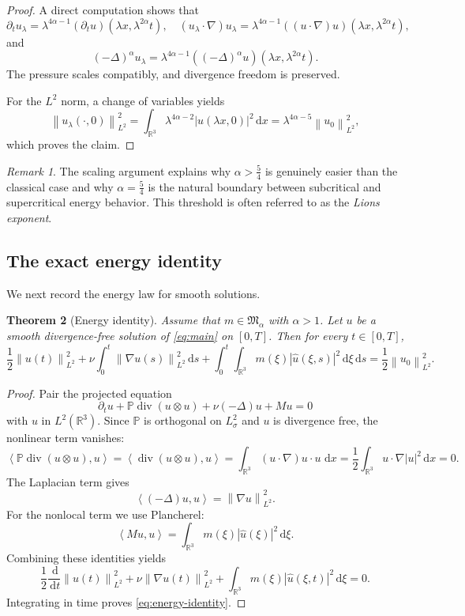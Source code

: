 \documentclass[11pt]{article}
\newtheorem{theorem}{Theorem}[section]
\theoremstyle{definition}
\theoremstyle{remark}
\newtheorem{remark}[theorem]{Remark}
\newcommand{\R}{\mathbb{R}}
\newcommand{\Pcal}{\mathbb{P}}
\newcommand{\dd}{\,\mathrm{d}}
\newcommand{\ip}[2]{\left\langle #1,#2\right\rangle}
\newcommand{\norm}[1]{\left\lVert #1\right\rVert}
\newcommand{\abs}[1]{\left\lvert #1\right\rvert}
\newcommand{\diver}{\operatorname{div}}
\begin{document}
\begin{proof}
A direct computation shows that
\[
\partial_t u_\lambda
=
\lambda^{4\alpha-1}(\partial_t u)(\lambda x,\lambda^{2\alpha}t),
\quad
(u_\lambda\cdot\nabla)u_\lambda
=
\lambda^{4\alpha-1}((u\cdot\nabla)u)(\lambda x,\lambda^{2\alpha}t),
\]
and
\[
(-\Delta)^\alpha u_\lambda
=
\lambda^{4\alpha-1}((-\Delta)^\alpha u)(\lambda x,\lambda^{2\alpha}t).
\]
The pressure scales compatibly, and divergence freedom is preserved.

For the $L^2$ norm, a change of variables yields
\[
\norm{u_\lambda(\cdot,0)}_{L^2}^2
=
\int_{\R^3}\lambda^{4\alpha-2}\abs{u(\lambda x,0)}^2\dd x
=
\lambda^{4\alpha-5}\norm{u_0}_{L^2}^2,
\]
which proves the claim.
\end{proof}

\begin{remark}
The scaling argument explains why $\alpha>\frac54$ is genuinely easier than the classical case and why $\alpha=\frac54$ is the natural boundary between subcritical and supercritical energy behavior. This threshold is often referred to as the \emph{Lions exponent}.
\end{remark}

\subsection{The exact energy identity}

We next record the energy law for smooth solutions.

\begin{theorem}[Energy identity]\label{thm:energy}
Assume that $m\in\mathfrak M_\alpha$ with $\alpha>1$. Let $u$ be a smooth divergence-free solution of \eqref{eq:main} on $[0,T]$. Then for every $t\in[0,T]$,
\begin{equation}\label{eq:energy-identity}
\frac12 \norm{u(t)}_{L^2}^2
+
\nu \int_0^t \norm{\nabla u(s)}_{L^2}^2 \dd s
+
\int_0^t \int_{\R^3} m(\xi)\abs{\hat u(\xi,s)}^2\dd \xi \dd s
=
\frac12 \norm{u_0}_{L^2}^2.
\end{equation}
\end{theorem}

\begin{proof}
Pair the projected equation
\[
\partial_t u + \Pcal \diver(u\otimes u) + \nu(-\Delta)u + M u =0
\]
with $u$ in $L^2(\R^3)$. Since $\Pcal$ is orthogonal on $L^2_\sigma$ and $u$ is divergence free, the nonlinear term vanishes:
\[
\ip{\Pcal \diver(u\otimes u)}{u}
=
\ip{\diver(u\otimes u)}{u}
=
\int_{\R^3} (u\cdot\nabla)u\cdot u\,\dd x
=
\frac12 \int_{\R^3} u\cdot\nabla \abs{u}^2 \dd x
=0.
\]
The Laplacian term gives
\[
\ip{(-\Delta)u}{u}=\norm{\nabla u}_{L^2}^2.
\]
For the nonlocal term we use Plancherel:
\[
\ip{Mu}{u}
=
\int_{\R^3} m(\xi)\abs{\hat u(\xi)}^2 \dd \xi.
\]
Combining these identities yields
\[
\frac12 \frac{\dd}{\dd t}\norm{u(t)}_{L^2}^2
+
\nu \norm{\nabla u(t)}_{L^2}^2
+
\int_{\R^3}m(\xi)\abs{\hat u(\xi,t)}^2 \dd \xi
=
0.
\]
Integrating in time proves \eqref{eq:energy-identity}.
\end{proof}
\end{document}
